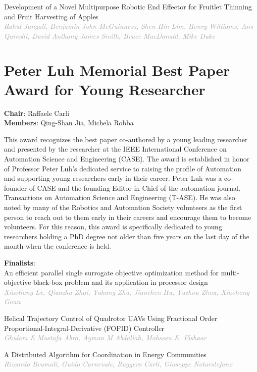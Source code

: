 \documentclass[
	openany, %
	parskip=full, %
	12pt, %
	a4paper, %
]{conferencebooklet} %
\begin{document}
\begin{multicols*}{2}
\small Development of a Novel Multipurpose Robotic End Effector for Fruitlet Thinning and Fruit Harvesting of Apples \\
\footnotesize \textit{\textcolor{darkgray}{Rahul Jangali, Benjamin John McGuinness, Shen Hin Lim, Henry Williams, Ans Qureshi, David Anthony James Smith, Bruce MacDonald, Mike Duke}}

\normalsize

\section{Peter Luh Memorial Best Paper Award for Young Researcher}
\textbf{Chair}: Raffaele Carli \\
\textbf{Members}: Qing-Shan Jia, Michela Robba 

This award recognizes the best paper co-authored by a young leading researcher and presented by the researcher at the IEEE International Conference on Automation Science and Engineering (CASE).
The award is established in honor of Professor Peter Luh’s dedicated service to raising the profile of Automation and supporting young researchers early in their career. Peter Luh was a co-founder of CASE and the founding Editor in Chief of the automation journal, Transactions on Automation Science and Engineering (T-ASE). He was also noted by many of the Robotics and Automation Society volunteers as the first person to reach out to them early in their careers and encourage them to become volunteers. For this reason, this award is specifically dedicated to young researchers holding a PhD  degree not older than five years on the last day of the month when 
the conference is held.

\textbf{Finalists}: \\
\small An efficient parallel single surrogate objective optimization method for multi-objective black-box problem and its application in processor design \\
\footnotesize \textit{\textcolor{darkgray}{Xiaoliang Lv, Qiaozhu Zhai, Yuhang Zhu, Jianchen Hu, Yuzhou Zhou, Xiaohong Guan}}

\small Helical Trajectory Control of Quadrotor UAVs Using Fractional Order Proportional-Integral-Derivative (FOPID) Controller \\
\footnotesize \textit{\textcolor{darkgray}{Ghulam E Mustafa Abro, Ayman M Abdallah, Mohssen E. Elshaar}}

\small A Distributed Algorithm for Coordination in Energy Communities \\
\footnotesize \textit{\textcolor{darkgray}{Riccardo Brumali, Guido Carnevale, Ruggero Carli, Giuseppe Notarstefano}} 


\end{multicols*}
\end{document}
